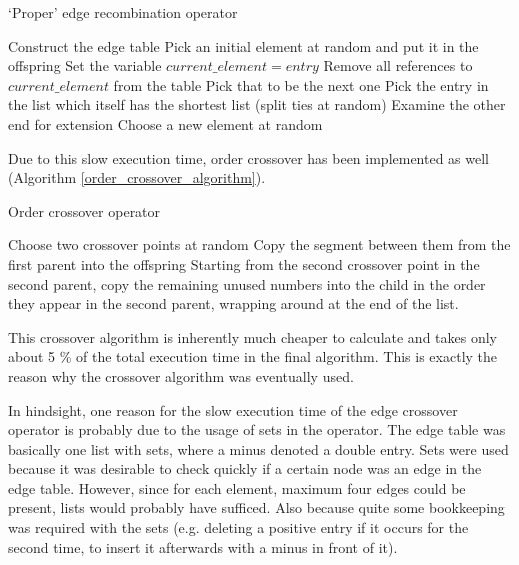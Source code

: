 \documentclass[a4paper,10pt]{article}
\begin{document}
\begin{algorithm}
\caption{`Proper' edge recombination operator \cite{eiben_smith}}\label{proper_edge_crossover}
\begin{algorithmic}
\State Construct the edge table
\State Pick an initial element at random and put it in the offspring
\State Set the variable $current\_element = entry$
\State Remove all references to $current\_element$ from the table
\State Pick that to be the next one
\Else
\State Pick the entry in the list which itself has the shortest list (split ties at random)
\EndIf
{}
\State Examine the other end for extension
\Else
\State Choose a new element at random
\EndIf
\EndIf
\EndWhile
\end{algorithmic}
\end{algorithm}

Due to this slow execution time, order crossover \cite{eiben_smith} has been implemented as well (Algorithm \ref{order_crossover_algorithm}).

\begin{algorithm}
\caption{Order crossover operator \cite{eiben_smith}}\label{order_crossover_algorithm}
\begin{algorithmic}
\State Choose two crossover points at random
\State Copy the segment between them from the first parent into the offspring
\State Starting from the second crossover point in the second parent, copy the remaining unused numbers into the child in the order they appear in the second parent, wrapping around at the end of the list.
\end{algorithmic}
\end{algorithm}

This crossover algorithm is inherently much cheaper to calculate and takes only about 5 \% %
of the total execution time in the final algorithm. This is exactly the reason why the crossover algorithm was eventually used. 

In hindsight, one reason for the slow execution time of the edge crossover operator is probably due to the usage of sets in the operator. The edge table was basically one list with sets, where a minus denoted a double entry. Sets were used because it was desirable to check quickly if a certain node was an edge in the edge table. However, since for each element, maximum four edges could be present, lists would probably have sufficed. Also because quite some bookkeeping was required with the sets (e.g. deleting a positive entry if it occurs for the second time, to insert it afterwards with a minus in front of it). 
\end{document}
